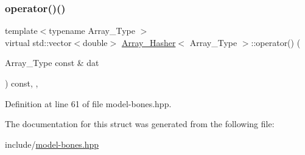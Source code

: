 \subsubsection{\texorpdfstring{operator()()}{operator()()}}
{\footnotesize\ttfamily template$<$typename Array\+\_\+\+Type $>$ \\
virtual std\+::vector$<$double$>$ \hyperlink{struct_array___hasher}{Array\+\_\+\+Hasher}$<$ Array\+\_\+\+Type $>$\+::operator() (\begin{DoxyParamCaption}\item[{Array\+\_\+\+Type const \&}]{dat }\end{DoxyParamCaption}) const\hspace{0.3cm}{\ttfamily [inline]}, {\ttfamily [virtual]}, {\ttfamily [noexcept]}}



Definition at line 61 of file model-\/bones.\+hpp.



The documentation for this struct was generated from the following file\+:\begin{DoxyCompactItemize}
\item 
include/\hyperlink{model-bones_8hpp}{model-\/bones.\+hpp}\end{DoxyCompactItemize}
